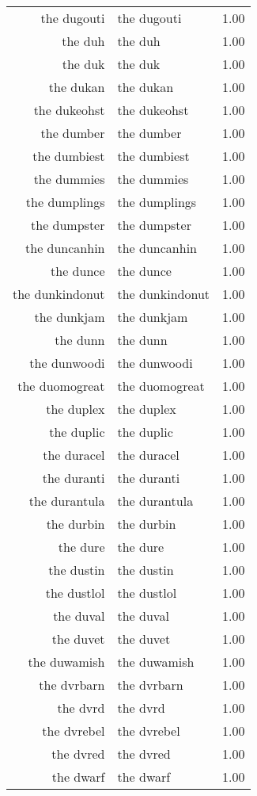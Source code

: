 \begin{table}[ht]
\begin{tabular}{rlr}
  the dugouti & the dugouti & 1.00 \\ 
  the duh & the duh & 1.00 \\ 
  the duk & the duk & 1.00 \\ 
  the dukan & the dukan & 1.00 \\ 
  the dukeohst & the dukeohst & 1.00 \\ 
  the dumber & the dumber & 1.00 \\ 
  the dumbiest & the dumbiest & 1.00 \\ 
  the dummies & the dummies & 1.00 \\ 
  the dumplings & the dumplings & 1.00 \\ 
  the dumpster & the dumpster & 1.00 \\ 
  the duncanhin & the duncanhin & 1.00 \\ 
  the dunce & the dunce & 1.00 \\ 
  the dunkindonut & the dunkindonut & 1.00 \\ 
  the dunkjam & the dunkjam & 1.00 \\ 
  the dunn & the dunn & 1.00 \\ 
  the dunwoodi & the dunwoodi & 1.00 \\ 
  the duomogreat & the duomogreat & 1.00 \\ 
  the duplex & the duplex & 1.00 \\ 
  the duplic & the duplic & 1.00 \\ 
  the duracel & the duracel & 1.00 \\ 
  the duranti & the duranti & 1.00 \\ 
  the durantula & the durantula & 1.00 \\ 
  the durbin & the durbin & 1.00 \\ 
  the dure & the dure & 1.00 \\ 
  the dustin & the dustin & 1.00 \\ 
  the dustlol & the dustlol & 1.00 \\ 
  the duval & the duval & 1.00 \\ 
  the duvet & the duvet & 1.00 \\ 
  the duwamish & the duwamish & 1.00 \\ 
  the dvrbarn & the dvrbarn & 1.00 \\ 
  the dvrd & the dvrd & 1.00 \\ 
  the dvrebel & the dvrebel & 1.00 \\ 
  the dvred & the dvred & 1.00 \\ 
  the dwarf & the dwarf & 1.00 \\ 

\end{tabular}
\end{table}
